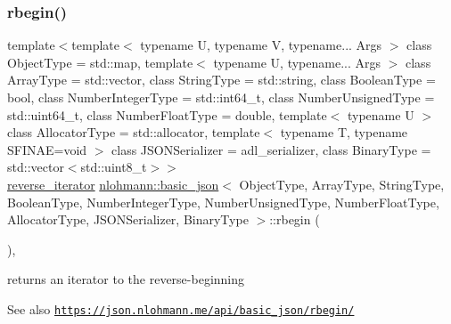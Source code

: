 \subsubsection{\texorpdfstring{rbegin()}{rbegin()}\hspace{0.1cm}{\footnotesize\ttfamily [1/2]}}
{\footnotesize\ttfamily template$<$template$<$ typename U, typename V, typename... Args $>$ class Object\+Type = std\+::map, template$<$ typename U, typename... Args $>$ class Array\+Type = std\+::vector, class String\+Type  = std\+::string, class Boolean\+Type  = bool, class Number\+Integer\+Type  = std\+::int64\+\_\+t, class Number\+Unsigned\+Type  = std\+::uint64\+\_\+t, class Number\+Float\+Type  = double, template$<$ typename U $>$ class Allocator\+Type = std\+::allocator, template$<$ typename T, typename S\+F\+I\+N\+A\+E=void $>$ class J\+S\+O\+N\+Serializer = adl\+\_\+serializer, class Binary\+Type  = std\+::vector$<$std\+::uint8\+\_\+t$>$$>$ \\
\hyperlink{classnlohmann_1_1basic__json_a5b8c0ebedd920b507f4f7ff4e19bf3c6}{reverse\+\_\+iterator} \hyperlink{classnlohmann_1_1basic__json}{nlohmann\+::basic\+\_\+json}$<$ Object\+Type, Array\+Type, String\+Type, Boolean\+Type, Number\+Integer\+Type, Number\+Unsigned\+Type, Number\+Float\+Type, Allocator\+Type, J\+S\+O\+N\+Serializer, Binary\+Type $>$\+::rbegin (\begin{DoxyParamCaption}{ }\end{DoxyParamCaption})\hspace{0.3cm}{\ttfamily [inline]}, {\ttfamily [noexcept]}}



returns an iterator to the reverse-\/beginning 

\begin{DoxySeeAlso}{See also}
\href{https://json.nlohmann.me/api/basic_json/rbegin/}{\tt https\+://json.\+nlohmann.\+me/api/basic\+\_\+json/rbegin/} 
\end{DoxySeeAlso}
\mbox{\label{classnlohmann_1_1basic__json_aab1329f44c8301b7679962726a043549}} 
